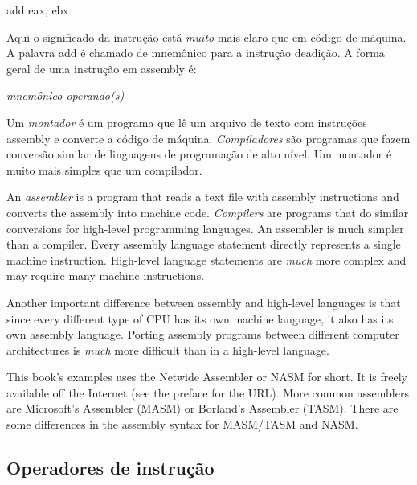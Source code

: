 \begin{CodeQuote}
   add eax, ebx
\end{CodeQuote}
Aqui o significado da instrução está \emph{muito} mais claro que em código
de máquina. A palavra {\code add} é chamado de {mnemônico} 
para a instrução deadição. A forma geral de uma instrução em assembly é:
\begin{CodeQuote}
  {\em mnemônico operando(s)}
\end{CodeQuote}


Um \emph{montador}  é um programa que lê um arquivo de texto
com instruções assembly e converte a código de máquina. \emph{Compiladores}
 são programas que fazem conversão similar de linguagens
de programação de alto nível. Um montador é muito mais simples que um
compilador. \MarginNote{}

An \emph{assembler}  is a program that reads a text
file with assembly instructions and converts the assembly into machine
code.  \emph{Compilers}  are programs that do similar
conversions for high-level programming languages. An assembler is much
simpler than a compiler.  Every
assembly language statement directly represents a single machine
instruction. High-level language statements are \emph{much} more
complex and may require many machine instructions.

Another important difference between assembly and high-level languages is that
since every different type of CPU has its own machine language, it also has
its own assembly language. Porting assembly programs between different computer
architectures is \emph{much} more difficult than in a high-level language.

This book's examples uses the Netwide Assembler or NASM 
for short. It is freely available off the Internet (see the preface
for the URL). More common assemblers are Microsoft's Assembler (MASM)
 or Borland's Assembler (TASM).  There are
some differences in the assembly syntax for MASM/TASM and NASM.

\subsection{Operadores de instrução}

